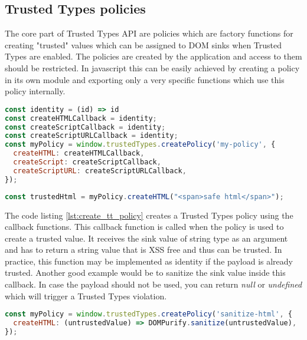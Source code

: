 \subsection{Trusted Types policies}
\label{subsec:tt_policy}

The core part of Trusted Types API are policies which are factory functions for creating "trusted"
values which can be assigned to DOM sinks when Trusted Types are enabled. The policies are created
by the application and access to them should be restricted. In javascript this can be easily
achieved by creating a policy in its own module and exporting only a very specific functions which
use this policy internally.

\bigskip
\begin{lstlisting}[language=JavaScript, caption=Creating Trusted Types policy, label={lst:create_tt_policy}]
const identity = (id) => id
const createHTMLCallback = identity;
const createScriptCallback = identity;
const createScriptURLCallback = identity;
const myPolicy = window.trustedTypes.createPolicy('my-policy', {
  createHTML: createHTMLCallback,
  createScript: createScriptCallback,
  createScriptURL: createScriptURLCallback,
});
\end{lstlisting}

\bigskip
\begin{lstlisting}[language=JavaScript, caption=Create trusted value using a policy]
const trustedHtml = myPolicy.createHTML("<span>safe html</span>");
\end{lstlisting}

The code listing \ref{lst:create_tt_policy} creates a Trusted Types policy using the callback
functions. This callback function is called when the policy is used to create a trusted value. It
receives the sink value of string type as an argument and has to return a string value that is XSS
free and thus can be trusted. In practice, this function may be implemented as identity if the
payload is already trusted. Another good example would be to sanitize the sink value inside this
callback. In case the payload should not be used, you can return \textit{null} or \textit{undefined}
which will trigger a Trusted Types violation.

\bigskip
\begin{lstlisting}[language=JavaScript, caption=Using a policy to sanitize HTML values]
const myPolicy = window.trustedTypes.createPolicy('sanitize-html', {
  createHTML: (untrustedValue) => DOMPurify.sanitize(untrustedValue),
});
\end{lstlisting}

